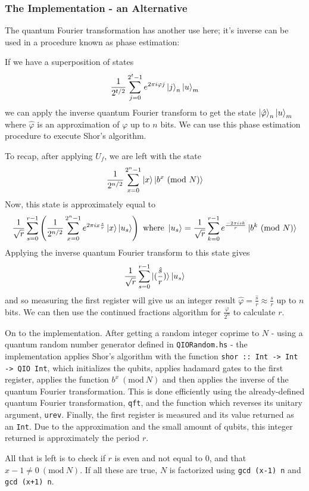 \documentclass[a4paper,10pt, titlepage, twoside]{article}
\newcommand{\Mod}[1]{\ (\mathrm{mod}\ #1)}
\begin{document}
\subsubsection{The Implementation - an Alternative}
The quantum Fourier transformation has another use here; it's inverse can be used in a procedure known as phase estimation:

If we have a superposition of states
$$\frac{1}{2^{t/2}}\sum_{j=0}^{2^t-1}e^{2\pi i \varphi j} \ket j _n \ket u _m$$
we can apply the inverse quantum Fourier transform to get the state $\ket {\hat{\varphi}}_n \ket u _m$ where  $\hat{\varphi}$ is an approximation of $ \varphi $ up to $n$ bits. We can use this phase estimation procedure to execute Shor's algorithm.\par
To recap, after applying $U_f$, we are left with the state
$$\frac{1}{2^{n/2}} \sum_{x=0}^{2^n -1} \ket x \ket{b^x \Mod N}$$
Now, this state is approximately equal to 
$$\frac{1}{\sqrt{r}}\sum_{s=0}^{r-1}\left(\frac{1}{2^{n/2}} \sum_{x=0}^{2^n-1} e^{2\pi i x \frac{s}{r}} \ket x \ket{u_s}\right) \text{ where } \ket{u_s} = \frac{1}{\sqrt r} \sum_{k=0}^{r-1} e^{\frac{-2\pi isk}{r}} \ket{b^k \Mod N}$$
Applying the inverse quantum Fourier transform to this state gives
$$\frac{1}{\sqrt r}\sum_{s=0}^{r-1} \ket{( \frac{\hat s}{r} )} \ket{u_s}$$
and so measuring the first register will give us an integer result $\hat{\varphi} = \frac{\hat s}{r} \approx \frac{s}{r}$ up to $n$ bits. We can then use the continued fractions algorithm for $\frac{\varphi}{2^n}$ to calculate $r$.\par
On to the implementation. After getting a random integer coprime to $N$ - using a quantum random number generator defined in \texttt{QIORandom.hs} - the implementation applies Shor's algorithm with the function \texttt{shor :: Int -> Int -> QIO Int}, which initializes the qubits, applies hadamard gates to the first register, applies the function $b^x \Mod N$ and then applies the inverse of the quantum Fourier transformation. This is done efficiently using the already-defined quantum Fourier transformation, \texttt{qft}, and the function which reverses its unitary argument, \texttt{urev}. Finally, the first register is measured and its value returned as an \texttt{Int}. Due to the approximation and the small amount of qubits, this integer returned is approximately the period $r$.\par
All that is left is to check if $r$ is even and not equal to $0$, and that $x-1 \neq 0 \Mod N$. If all these are true, $N$ is factorized using \texttt{gcd (x-1) n} and \texttt{gcd (x+1) n}.
\end{document}
